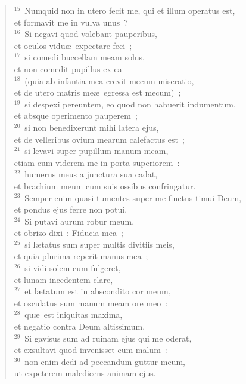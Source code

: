 \begin{flushleft}
\begin{verse}
${}^{15}$~Numquid non in utero fecit me, qui et illum operatus est,\\ et formavit me in vulva unus~?\\
${}^{16}$~Si negavi quod volebant pauperibus,\\ et oculos vidu\ae\ expectare feci~;\\
${}^{17}$~si comedi buccellam meam solus,\\ et non comedit pupillus ex ea\\
${}^{18}$~(quia ab infantia mea crevit mecum miseratio,\\ et de utero matris me\ae\ egressa est mecum)~;\\
${}^{19}$~si despexi pereuntem, eo quod non habuerit indumentum,\\ et absque operimento pauperem~;\\
${}^{20}$~si non benedixerunt mihi latera ejus,\\ et de velleribus ovium mearum calefactus est~;\\
${}^{21}$~si levavi super pupillum manum meam,\\ etiam cum viderem me in porta superiorem~:\\
${}^{22}$~humerus meus a junctura sua cadat,\\ et brachium meum cum suis ossibus confringatur.\\
${}^{23}$~Semper enim quasi tumentes super me fluctus timui Deum,\\ et pondus ejus ferre non potui.\\
${}^{24}$~Si putavi aurum robur meum,\\ et obrizo dixi~: Fiducia mea~;\\
${}^{25}$~si l\ae tatus sum super multis divitiis meis,\\ et quia plurima reperit manus mea~;\\
${}^{26}$~si vidi solem cum fulgeret,\\ et lunam incedentem clare,\\
${}^{27}$~et l\ae tatum est in abscondito cor meum,\\ et osculatus sum manum meam ore meo~:\\
${}^{28}$~qu\ae\ est iniquitas maxima,\\ et negatio contra Deum altissimum.\\
${}^{29}$~Si gavisus sum ad ruinam ejus qui me oderat,\\ et exsultavi quod invenisset eum malum~:\\
${}^{30}$~non enim dedi ad peccandum guttur meum,\\ ut expeterem maledicens animam ejus.\\

\end{verse}
\end{flushleft}

